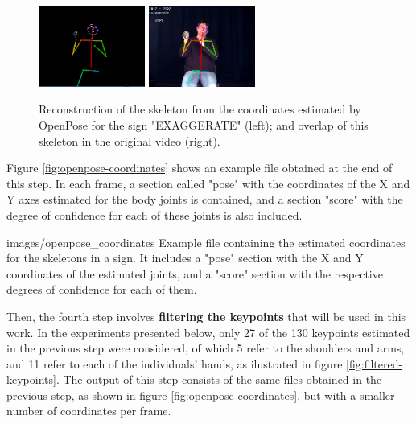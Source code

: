 \begin{figure}[ht]
    \centering
    \includegraphics[width=3.5cm]{images/sign_pose}
    \includegraphics[width=3.5cm]{images/sign_pose_blended}
    \caption{Reconstruction of the skeleton from the coordinates estimated by OpenPose for the sign "EXAGGERATE" (left); and overlap of this skeleton in the original video (right).}
    \label{fig:sign-pose}
\end{figure}

Figure \ref{fig:openpose-coordinates} shows an example file obtained at the end of this step. In each frame, a section called "pose" with the coordinates of the X and Y axes estimated for  the body joints is contained, and a section "score" with the degree of confidence for each of these joints is also included.

    {images/openpose_coordinates}
    {Example file containing the estimated coordinates for the skeletons in a sign. It includes a "pose" section with the X and Y coordinates of the estimated joints, and a "score" section with the respective degrees of confidence for each of them.}
    
Then, the fourth step involves \textbf{filtering the keypoints} that will be used in this work. In the experiments presented below, only 27 of the 130 keypoints estimated in the previous step were considered, of which 5 refer to the shoulders and arms, and 11 refer to each of the individuals' hands, as ilustrated in figure \ref{fig:filtered-keypoints}. The output of this step consists of the same files obtained in the previous step, as shown in figure \ref{fig:openpose-coordinates}, but with a smaller number of coordinates per frame.

